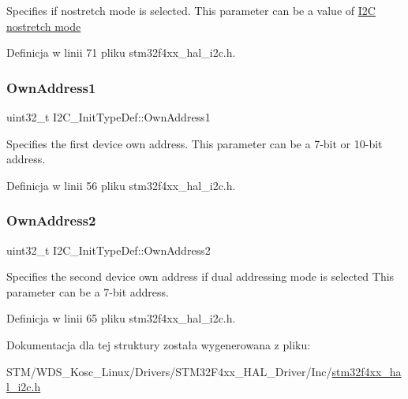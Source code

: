 Specifies if nostretch mode is selected. This parameter can be a value of \hyperlink{group___i2_c__nostretch__mode}{I2C nostretch mode} 

Definicja w linii 71 pliku stm32f4xx\+\_\+hal\+\_\+i2c.\+h.

\mbox{\label{struct_i2_c___init_type_def_abfb610317ea08e85c8feece82ccc9e16}} 
\subsubsection{\texorpdfstring{Own\+Address1}{OwnAddress1}}
{\footnotesize\ttfamily uint32\+\_\+t I2\+C\+\_\+\+Init\+Type\+Def\+::\+Own\+Address1}

Specifies the first device own address. This parameter can be a 7-\/bit or 10-\/bit address. 

Definicja w linii 56 pliku stm32f4xx\+\_\+hal\+\_\+i2c.\+h.

\mbox{\label{struct_i2_c___init_type_def_a8165caf61b7b52f903edd7517ddaa06b}} 
\subsubsection{\texorpdfstring{Own\+Address2}{OwnAddress2}}
{\footnotesize\ttfamily uint32\+\_\+t I2\+C\+\_\+\+Init\+Type\+Def\+::\+Own\+Address2}

Specifies the second device own address if dual addressing mode is selected This parameter can be a 7-\/bit address. 

Definicja w linii 65 pliku stm32f4xx\+\_\+hal\+\_\+i2c.\+h.



Dokumentacja dla tej struktury została wygenerowana z pliku\+:\begin{DoxyCompactItemize}
\item 
S\+T\+M/\+W\+D\+S\+\_\+\+Kosc\+\_\+\+Linux/\+Drivers/\+S\+T\+M32\+F4xx\+\_\+\+H\+A\+L\+\_\+\+Driver/\+Inc/\hyperlink{stm32f4xx__hal__i2c_8h}{stm32f4xx\+\_\+hal\+\_\+i2c.\+h}\end{DoxyCompactItemize}

